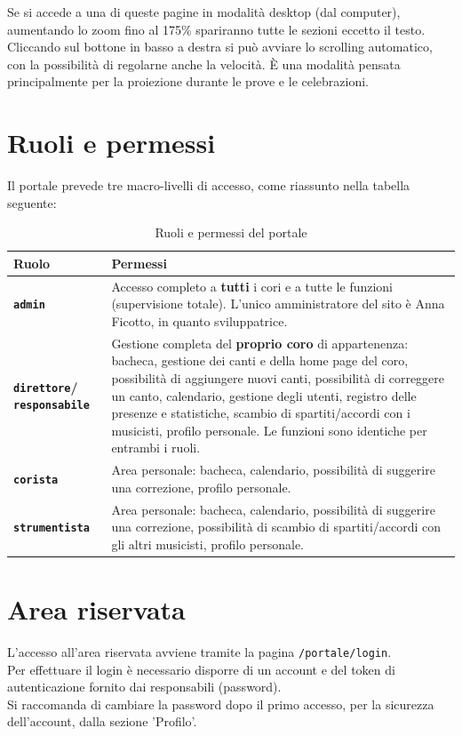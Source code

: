 \documentclass[a4paper,12pt]{article}
\newcommand{\roleadmin}{\texttt{admin}}
\newcommand{\roledirettore}{\texttt{direttore}}
\newcommand{\roleresponsabile}{\texttt{responsabile}}
\newcommand{\rolecorista}{\texttt{corista}}
\newcommand{\rolestrumentista}{\texttt{strumentista}}
\begin{document}
	Se si accede a una di queste pagine in modalità desktop (dal computer), aumentando lo zoom fino al 175\% spariranno tutte le sezioni eccetto il testo. Cliccando sul bottone in basso a destra si può avviare lo scrolling automatico, con la possibilità di regolarne anche la velocità. È una modalità pensata principalmente per la proiezione durante le prove e le celebrazioni.
	
	
	\section{Ruoli e permessi}
	Il portale prevede tre macro-livelli di accesso, come riassunto nella tabella seguente:
	
	\begin{table}[h]
		\centering
		\begin{tabular}{>{\bfseries}l p{10cm}}
			\toprule
			Ruolo & Permessi \\
			\midrule
			\roleadmin & Accesso completo a \textbf{tutti} i cori e a tutte le funzioni (supervisione totale). L'unico amministratore del sito è Anna Ficotto, in quanto sviluppatrice.\\
			\roledirettore \space / \roleresponsabile & Gestione completa del \textbf{proprio coro} di appartenenza: bacheca, gestione dei canti e della home page del coro, possibilità di aggiungere nuovi canti, possibilità di correggere un canto, calendario, gestione degli utenti, registro delle presenze e statistiche, scambio di spartiti/accordi con i musicisti, profilo personale. Le funzioni sono identiche per entrambi i ruoli. \\
			\rolecorista & Area personale: bacheca, calendario, possibilità di suggerire una correzione, profilo personale.\\
			\rolestrumentista & Area personale: bacheca, calendario, possibilità di suggerire una correzione, possibilità di scambio di spartiti/accordi con gli altri musicisti, profilo personale.\\
			\bottomrule
		\end{tabular}
		\caption{Ruoli e permessi del portale}
		\label{tab:ruoli}
	\end{table}
	
	
	
	
	\section{Area riservata}
	L'accesso all'area riservata avviene tramite la pagina \texttt{/portale/login}.\\
	Per effettuare il login è necessario disporre di un account e del token di autenticazione fornito dai responsabili (password).\\
	Si raccomanda di cambiare la password dopo il primo accesso, per la sicurezza dell'account, dalla sezione 'Profilo'.\\
	 
\end{document}
